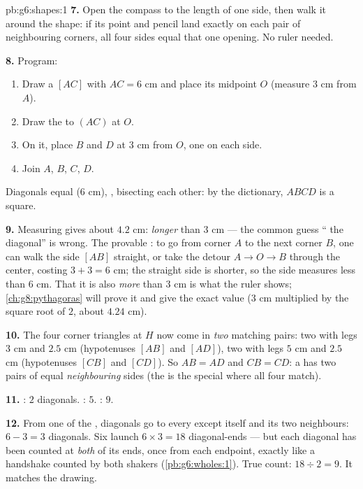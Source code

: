 \begin{solution}{pb:g6:shapes:1}
\textbf{7.} Open the compass to the length of one side, then
walk it around the shape: if its point and pencil land exactly
on each pair of neighbouring corners, all four sides equal that
one opening. No ruler needed.

\textbf{8.} Program:
\begin{enumerate}
  \item Draw a  $[AC]$ with $AC = 6$ cm and place its
        midpoint $O$ (measure $3$ cm from $A$).
  \item Draw the  to $(AC)$ at $O$.
  \item On it, place $B$ and $D$ at $3$ cm from $O$, one on each
        side.
  \item Join $A$, $B$, $C$, $D$.
\end{enumerate}
Diagonals equal ($6$ cm), , bisecting each other:
by the dictionary, $ABCD$ is a square.

\textbf{9.} Measuring gives about $4.2$ cm: \emph{longer} than
$3$ cm --- the common guess `` the diagonal'' is wrong. The
provable : to go from corner $A$ to the next corner $B$, one
can walk the side $[AB]$ straight, or take the detour
$A \to O \to B$ through the center, costing $3 + 3 = 6$ cm; the
straight side is shorter, so the side measures less than $6$ cm.
That it is also \emph{more} than $3$ cm is what the ruler shows;
\cref{ch:g8:pythagoras} will prove it and give the exact value
($3$ cm multiplied by the square root of $2$, about $4.24$ cm).

\textbf{10.} The four corner triangles at $H$ now come in
\emph{two} matching pairs: two with legs $3$ cm and $2.5$ cm
(hypotenuses $[AB]$ and $[AD]$), two with legs $5$ cm and
$2.5$ cm (hypotenuses $[CB]$ and $[CD]$). So $AB = AD$ and
$CB = CD$: a  has two pairs of equal \emph{neighbouring}
sides (the  is the special  where all four match).

\textbf{11.} : $2$ diagonals. : $5$.
: $9$.

\textbf{12.} From one  of the , diagonals go to
every  except itself and its two neighbours: $6 - 3 = 3$
diagonals. Six  launch $6 \times 3 = 18$ diagonal-ends
--- but each diagonal has been counted at \emph{both} of its
ends, once from each endpoint, exactly like a handshake counted
by both shakers (\cref{pb:g6:wholes:1}). True count:
$18 \div 2 = 9$. It matches the drawing.


\end{solution}
